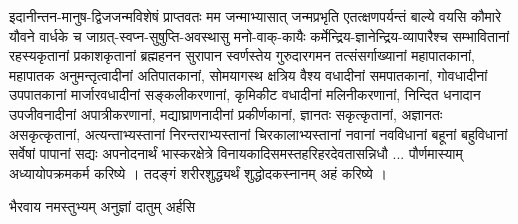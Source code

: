 इदानीन्तन-मानुष-द्विजजन्मविशेषं प्राप्तवतः मम जन्माभ्यासात् जन्मप्रभृति एतत्क्षणपर्यन्तं बाल्ये वयसि
कौमारे यौवने वार्धके च जाग्रत्-स्वप्न-सुषुप्ति-अवस्थासु मनो-वाक्-कायैः
कर्मेन्द्रिय-ज्ञानेन्द्रिय-व्यापारैश्च सम्भावितानां रहस्यकृतानां प्रकाशकृतानां ब्रह्महनन सुरापान
स्वर्णस्तेय गुरुदारगमन तत्संसर्गाख्यानां महापातकानां, महापातक अनुमन्तृत्वादीनां अतिपातकानां,
सोमयागस्थ क्षत्रिय वैश्य वधादीनां समपातकानां, गोवधादीनां उपपातकानां मार्जारवधादीनां सङ्कलीकरणानां,
कृमिकीट वधादीनां मलिनीकरणानां, निन्दित धनादान उपजीवनादीनां अपात्रीकरणानां, मद्याघ्राणनादीनां
प्रकीर्णकानां, ज्ञानतः सकृत्कृतानां, अज्ञानतः असकृत्कृतानां, अत्यन्ताभ्यस्तानां निरन्तराभ्यस्तानां
चिरकालाभ्यस्तानां नवानां नवविधानां बहूनां बहुविधानां सर्वेषां पापानां सद्यः अपनोदनार्थं
भास्करक्षेत्रे  विनायकादिसमस्तहरिहरदेवतासन्निधौ ... पौर्णमास्याम् अध्यायोपक्रमकर्म करिष्ये ।  तदङ्गं
शरीरशुद्ध्यर्थं शुद्धोदकस्नानम् अहं करिष्ये ।
    
     {भैरवाय नमस्तुभ्यम् अनुज्ञां दातुम् अर्हसि}

    




